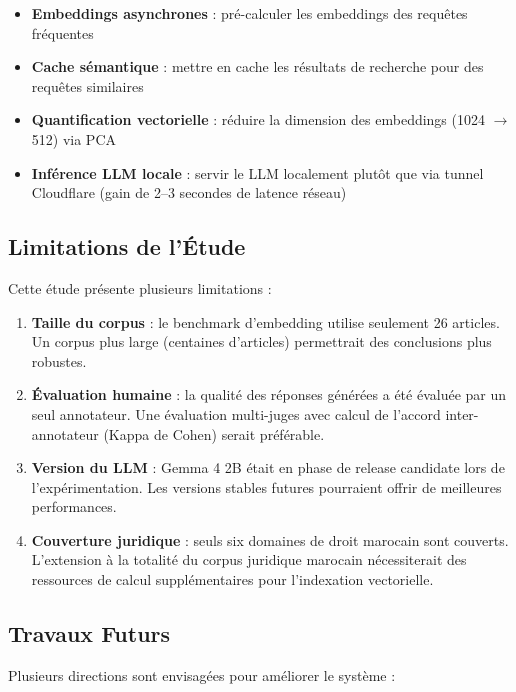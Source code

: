 \begin{itemize}
    \item \textbf{Embeddings asynchrones} : pré-calculer les embeddings des
    requêtes fréquentes
    \item \textbf{Cache sémantique} : mettre en cache les résultats de
    recherche pour des requêtes similaires
    \item \textbf{Quantification vectorielle} : réduire la dimension des
    embeddings (1024 $\rightarrow$ 512) via PCA
    \item \textbf{Inférence LLM locale} : servir le LLM localement plutôt
    que via tunnel Cloudflare (gain de 2--3 secondes de latence réseau)
\end{itemize}

\subsection{Limitations de l'Étude}

Cette étude présente plusieurs limitations :

\begin{enumerate}
    \item \textbf{Taille du corpus} : le benchmark d'embedding utilise
    seulement 26 articles. Un corpus plus large (centaines d'articles)
    permettrait des conclusions plus robustes.
    \item \textbf{Évaluation humaine} : la qualité des réponses générées
    a été évaluée par un seul annotateur. Une évaluation multi-juges avec
    calcul de l'accord inter-annotateur (Kappa de Cohen) serait préférable.
    \item \textbf{Version du LLM} : Gemma 4 2B était en phase de release
    candidate lors de l'expérimentation. Les versions stables futures
    pourraient offrir de meilleures performances.
    \item \textbf{Couverture juridique} : seuls six domaines de droit
    marocain sont couverts. L'extension à la totalité du corpus juridique
    marocain nécessiterait des ressources de calcul supplémentaires pour
    l'indexation vectorielle.
\end{enumerate}

\subsection{Travaux Futurs}

Plusieurs directions sont envisagées pour améliorer le système :

